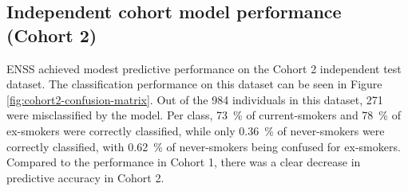 \documentclass{article} %
\begin{document}
\subsection{Independent cohort model performance (Cohort 2)} \label{sec:cohort2-performance}
ENSS achieved modest predictive performance on the Cohort 2 independent test dataset. The classification performance on this dataset can be seen in Figure \ref{fig:cohort2-confusion-matrix}. Out of the 984 individuals in this dataset, 271 were misclassified by the model. Per class, \SI{73}{\percent} of current-smokers and \SI{78}{\percent} of ex-smokers were correctly classified, while only \SI{0.36}{\percent} of never-smokers were correctly classified, with \SI{0.62}{\percent} of never-smokers being confused for ex-smokers. Compared to the performance in Cohort 1, there was a clear decrease in predictive accuracy in Cohort 2.
\end{document}
